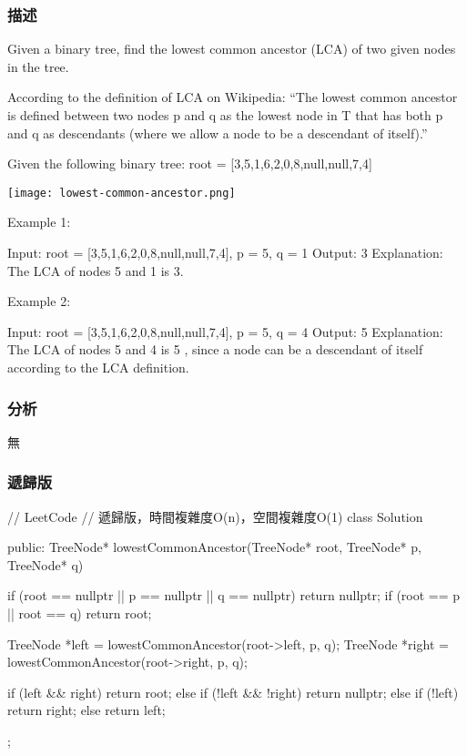 \subsubsection{描述}
Given a binary tree, find the lowest common ancestor (LCA) of two given nodes in the tree.

According to the definition of LCA on Wikipedia: “The lowest common ancestor is defined between two nodes p and q as the lowest node in T that has both p and q as descendants (where we allow a node to be a descendant of itself).”

Given the following binary tree:  root = [3,5,1,6,2,0,8,null,null,7,4]

\begin{center}
\texttt{[image: lowest-common-ancestor.png]}\\
\label{fig:lowest-common-ancestor}
\end{center}

Example 1:
\begin{Code}
Input: root = [3,5,1,6,2,0,8,null,null,7,4], p = 5, q = 1
Output: 3
Explanation: The LCA of nodes 5 and 1 is 3.
\end{Code}


Example 2:
\begin{Code}
Input: root = [3,5,1,6,2,0,8,null,null,7,4], p = 5, q = 4
Output: 5
Explanation: The LCA of nodes 5 and 4 is 5
, since a node can be a descendant of itself according to the LCA definition.
\end{Code}

\subsubsection{分析}
無


\subsubsection{遞歸版}
\begin{Code}
// LeetCode
// 遞歸版，時間複雜度O(n)，空間複雜度O(1)
class Solution {
public:
    TreeNode* lowestCommonAncestor(TreeNode* root, TreeNode* p, TreeNode* q) {
        if (root == nullptr || p == nullptr || q == nullptr) return nullptr;
        if (root == p || root == q) return root;

        TreeNode *left = lowestCommonAncestor(root->left, p, q);
        TreeNode *right = lowestCommonAncestor(root->right, p, q);

        if (left && right)
            return root;
        else if (!left && !right)
            return nullptr;
        else if (!left)
            return right;
        else
            return left;
    }
};
\end{Code}


